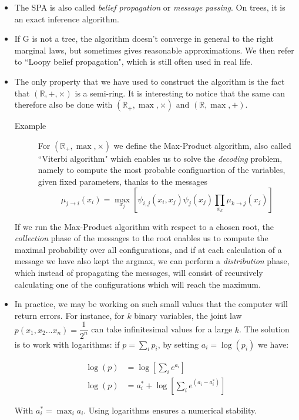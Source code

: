 \documentclass[12pt,a4paper]{report}
\newcommand{\forscribe}[2]{#2}  %
\begin{document}
\begin{itemize}
	\item The SPA is also called \emph{belief propagation} \forscribe{}{or \textit{message passing}}. On trees, it is an exact inference algorithm.
	\item If G is not a tree, the algorithm doesn't converge in general to the right marginal laws, but sometimes gives reasonable approximations. We then refer to ``Loopy belief propagation", which is still often used in real life. %
	\item The only property that we have used to construct the algorithm is the fact that \( (\mathbb{R},+,\times) \) is a semi-ring. It is interesting to notice that the same can therefore also be done with \( (\mathbb{R}_+,\max,\times) \) and \( (\mathbb{R},\max,+) \). 
	
	\begin{description}
		\item[Example] For \( (\mathbb{R}_+,\max,\times) \) we define the Max-Product algorithm, also called ``Viterbi algorithm" which enables us to solve the \emph{decoding} problem, namely to compute the most probable configuartion of the variables, given fixed parameters, thanks to the messages
		\begin{equation}
			\mu_{j \rightarrow i}(x_i) = \max_{x_j} \left[ \psi_{i,j} (x_i,x_j) \psi_j(x_j) \prod_{x_k} \mu_{k \rightarrow j} (x_j)\right]
		\end{equation}
	\end{description}
	If we run the Max-Product algorithm with respect to a chosen root, the \emph{collection} phase of the messages to the root enables us to compute the maximal probability over all configurations, and if at each calculation of a message we have also kept the argmax, we can perform a \emph{distribution} phase, which instead of propagating the messages, will consist of recursively calculating one of the configurations which will reach the maximum.

	\item In practice, we may be working on such small values that the computer will return errors. For instance, for \(k\) binary variables, the joint law \(p(x_1,x_2...x_n)=\dfrac{1}{2^n}\) can take infinitesimal values for a large \( k \). The solution is to work with logarithms: if \( p = \sum_i p_i\), by setting  \( a_i = \log(p_i) \) we have:
	
	\begin{align}
		\log(p) 	&= \log \left [ \sum_i e^{a_i} \right ] \nonumber \\
		\log(p)	&= a_i^* + \log \left [ \sum_i e^{(a_i - a_i^*)} \right ]
	\end{align}
	
	With \( a_i^* = \max_i a_i \). Using logarithms ensures a numerical stability.
	
\end{itemize}
\end{document}
